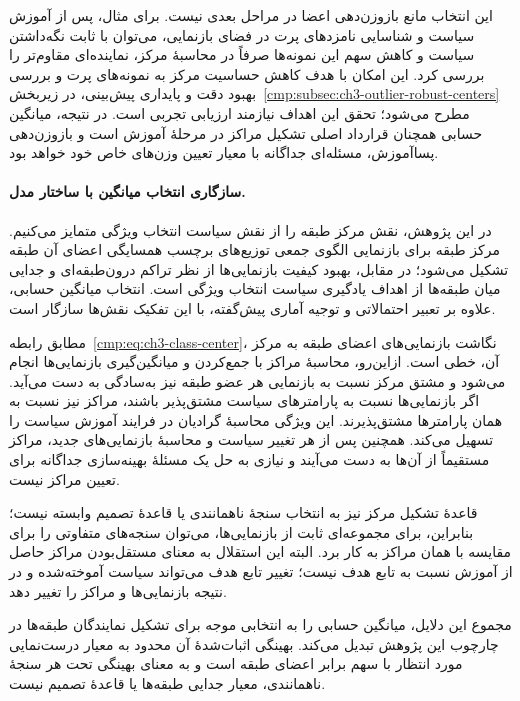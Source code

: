 این انتخاب مانع بازوزن‌دهی اعضا در مراحل بعدی نیست.
برای مثال، پس از آموزش سیاست و شناسایی نامزدهای پرت
در فضای بازنمایی، می‌توان با ثابت نگه‌داشتن سیاست و
کاهش سهم این نمونه‌ها صرفاً در محاسبهٔ مرکز، نماینده‌ای
مقاوم‌تر را بررسی کرد. این امکان با هدف کاهش حساسیت
مرکز به نمونه‌های پرت و بررسی بهبود دقت و پایداری
پیش‌بینی، در زیربخش~\ref{cmp:subsec:ch3-outlier-robust-centers}
مطرح می‌شود؛ تحقق این اهداف نیازمند ارزیابی تجربی است.
در نتیجه، میانگین حسابی همچنان قرارداد اصلی تشکیل مراکز
در مرحلهٔ آموزش است و بازوزن‌دهی پساآموزش، مسئله‌ای
جداگانه با معیار تعیین وزن‌های خاص خود خواهد بود.

\paragraph{سازگاری انتخاب میانگین با ساختار مدل.}
در این پژوهش، نقش مرکز طبقه را از نقش سیاست انتخاب ویژگی
متمایز می‌کنیم. مرکز طبقه برای بازنمایی الگوی جمعی
توزیع‌های برچسب همسایگی اعضای آن طبقه تشکیل می‌شود؛
در مقابل، بهبود کیفیت بازنمایی‌ها از نظر تراکم درون‌طبقه‌ای
و جدایی میان طبقه‌ها از اهداف یادگیری سیاست انتخاب ویژگی است.
انتخاب میانگین حسابی، علاوه بر تعبیر احتمالاتی و توجیه
آماری پیش‌گفته، با این تفکیک نقش‌ها سازگار است.

مطابق رابطه~\eqref{cmp:eq:ch3-class-center}، نگاشت بازنمایی‌های
اعضای طبقه به مرکز آن، خطی است. ازاین‌رو، محاسبهٔ مراکز
با جمع‌کردن و میانگین‌گیری بازنمایی‌ها انجام می‌شود و مشتق
مرکز نسبت به بازنمایی هر عضو طبقه نیز به‌سادگی به دست
می‌آید. اگر بازنمایی‌ها نسبت به پارامترهای سیاست مشتق‌پذیر
باشند، مراکز نیز نسبت به همان پارامترها مشتق‌پذیرند.
این ویژگی محاسبهٔ گرادیان در فرایند آموزش سیاست را تسهیل می‌کند.
همچنین پس از هر تغییر سیاست و محاسبهٔ بازنمایی‌های جدید،
مراکز مستقیماً از آن‌ها به دست می‌آیند و نیازی به حل یک
مسئلهٔ بهینه‌سازی جداگانه برای تعیین مراکز نیست.

قاعدهٔ تشکیل مرکز نیز به انتخاب سنجهٔ ناهمانندی یا قاعدهٔ
تصمیم وابسته نیست؛ بنابراین، برای مجموعه‌ای ثابت از
بازنمایی‌ها، می‌توان سنجه‌های متفاوتی را برای مقایسه با
همان مراکز به کار برد. البته این استقلال به معنای
مستقل‌بودن مراکز حاصل از آموزش نسبت به تابع هدف نیست؛
تغییر تابع هدف می‌تواند سیاست آموخته‌شده و در نتیجه
بازنمایی‌ها و مراکز را تغییر دهد.

مجموع این دلایل، میانگین حسابی را به انتخابی موجه برای
تشکیل نمایندگان طبقه‌ها در چارچوب این پژوهش تبدیل می‌کند.
بهینگی اثبات‌شدهٔ آن محدود به معیار درست‌نمایی مورد انتظار
با سهم برابر اعضای طبقه است و به معنای بهینگی تحت هر
سنجهٔ ناهمانندی، معیار جدایی طبقه‌ها یا قاعدهٔ تصمیم نیست.

